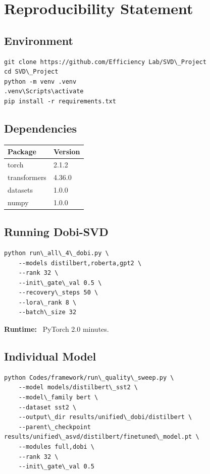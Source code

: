 
\section{Reproducibility Statement}

\subsection{Environment}

\begin{lstlisting}
git clone https://github.com/Efficiency Lab/SVD\_Project
cd SVD\_Project
python -m venv .venv
.venv\Scripts\activate
pip install -r requirements.txt
\end{lstlisting}

\subsection{Dependencies}

\begin{table}[H]
\centering
\small
\begin{tabular}{ll}
\toprule
\textbf{Package} & \textbf{Version} \\
\midrule
torch & 2.1.2 \\
transformers & 4.36.0 \\
datasets & 1.0.0 \\
numpy & 1.0.0 \\
\bottomrule
\end{tabular}
\end{table}

\subsection{Running Dobi-SVD}

\begin{lstlisting}
python run\_all\_4\_dobi.py \
    --models distilbert,roberta,gpt2 \
    --rank 32 \
    --init\_gate\_val 0.5 \
    --recovery\_steps 50 \
    --lora\_rank 8 \
    --batch\_size 32
\end{lstlisting}

\textbf{Runtime:} ~PyTorch 2.0 minutes.

\subsection{Individual Model}

\begin{lstlisting}
python Codes/framework/run\_quality\_sweep.py \
    --model models/distilbert\_sst2 \
    --model\_family bert \
    --dataset sst2 \
    --output\_dir results/unified\_dobi/distilbert \
    --parent\_checkpoint results/unified\_asvd/distilbert/finetuned\_model.pt \
    --modules full,dobi \
    --rank 32 \
    --init\_gate\_val 0.5
\end{lstlisting}

